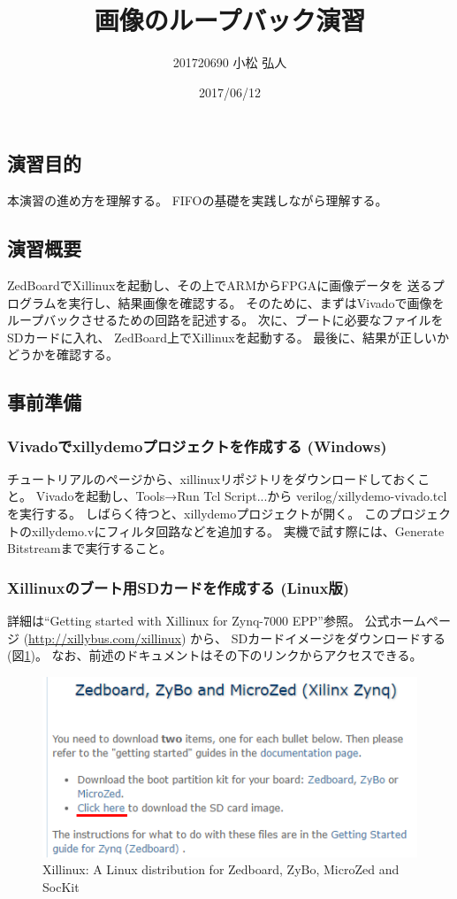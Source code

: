 \documentclass[11pt]{jsarticle}
\title{画像のループバック演習}
\author{201720690 小松 弘人}
\date{2017/06/12}
\begin{document}
\maketitle
\subsection*{演習目的}
本演習の進め方を理解する。
FIFOの基礎を実践しながら理解する。

\subsection*{演習概要}
ZedBoardでXillinuxを起動し、その上でARMからFPGAに画像データを
送るプログラムを実行し、結果画像を確認する。
そのために、まずはVivadoで画像をループバックさせるための回路を記述する。
次に、ブートに必要なファイルをSDカードに入れ、
ZedBoard上でXillinuxを起動する。
最後に、結果が正しいかどうかを確認する。

\subsection*{事前準備}
\subsubsection*{Vivadoでxillydemoプロジェクトを作成する (Windows)}
チュートリアルのページから、xillinuxリポジトリをダウンロードしておくこと。
Vivadoを起動し、Tools→Run Tcl Script...から
verilog/xillydemo-vivado.tclを実行する。
しばらく待つと、xillydemoプロジェクトが開く。
このプロジェクトのxillydemo.vにフィルタ回路などを追加する。
実機で試す際には、Generate Bitstreamまで実行すること。

\subsubsection*{Xillinuxのブート用SDカードを作成する (Linux版)}
詳細は``Getting started with Xillinux for Zynq-7000 EPP''参照。
公式ホームページ (\url{http://xillybus.com/xillinux}) から、
SDカードイメージをダウンロードする (図\ref{img:xillinux})。
なお、前述のドキュメントはその下のリンクからアクセスできる。

\begin{figure}[ht]
	\centering
	\includegraphics[width=0.5\linewidth]{img/xillinux.PNG}
	\caption{Xillinux: A Linux distribution for Zedboard, ZyBo, MicroZed and SocKit}
	\label{img:xillinux}
\end{figure}
\end{document}

